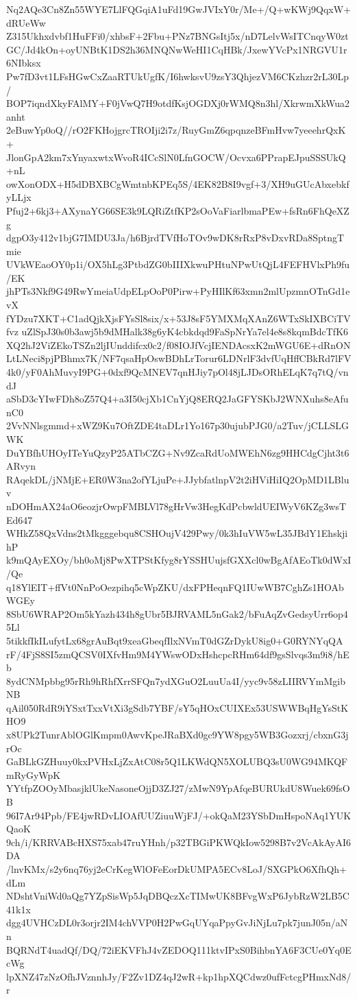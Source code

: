 Nq2AQe3Cn8Zn55WYE7LlFQGqiA1uFd19GwJVIxY0r/Me+/Q+wKWj9QqxW+dRUeWw
Z315Ukhxdvbf1HuFFi0/xhbsF+2Fbu+PNz7BNGsItj5x/nD7LelvWsITCnqyW0zt
GC/Jd4kOn+oyUNBtK1DS2h36MNQNwWeHI1CqHBk/JxewYVcPx1NRGVU1r6NIbksx
Pw7fD3vt1LFsHGwCxZaaRTUkUgfK/I6hwksvU9zsY3QhjezVM6CKzhzr2rL30Lp/
BOP7iqndXkyFAlMY+F0jVwQ7H9otdfKsjOGDXj0rWMQ8n3hl/XkrwmXkWua2anht
2eBuwYp0oQ//rO2FKHojgrcTROIji2i7z/RuyGmZ6qpqnzeBFmHvw7yeeehrQxK+
JlonGpA2km7xYnyaxwtxWvoR4ICcSlN0LfnGOCW/Ocvxa6PPrapEJpuSSSUkQ+nL
owXonODX+H5dDBXBCgWmtnbKPEq5S/4EK82B8I9vgf+3/XH9uGUcAbxebkfyLLjx
Pfuj2+6kj3+AXynaYG66SE3k9LQRiZtfKP2sOoVaFiarlbmaPEw+fsRn6FhQeXZg
dgpO3y412v1bjG7IMDU3Ja/h6BjrdTVfHoTOv9wDK8rRxP8vDxvRDa8SptngTmie
UVkWEaoOY0p1i/OX5hLg3PtbdZG0bIIIXkwuPHtuNPwUtQjL4FEFHVlxPh9fu/EK
jhPTs3Nkf9G49RwYmeiaUdpELpOoP0Pirw+PyHIlKf63xmn2mlUpzmnOTnGd1evX
fYDzu7XKT+C1adQjkXjsFYsSl8six/x+53J8sF5YMXMqXAnZ6WTxSkIXBCiTVfvz
uZlSpJ30s0b3awj5b9dMHalk38g6yK4cbkdqd9FaSpNrYa7el4e8s8kqmBdcTfK6
XQ2hJ2ViZEkoTSZn2ljIUnddifcx0c2/f08IOJfVcjIENDAcsxK2mWGU6E+dRnON
LtLNeci8pjPBhmx7K/NF7qsaHpOswBDhLrTorur6LDNrlF3dvfUqHffCBkRd7lFV
4k0/yF0AhMuvyI9PG+0dxf9QcMNEV7qnHJiy7pOl48jLJDsORhELqK7q7tQ/vndJ
aSbD3cYIwFDh8oZ57Q4+a3I50cjXb1CnYjQ8ERQ2JaGFYSKbJ2WNXuhs8eAfunC0
2VvNNlsgmmd+xWZ9Ku7OftZDE4taDLr1Yo167p30ujubPJG0/a2Tuv/jCLLSLGWK
DuYBfhUHOyITeYuQzyP25ATbCZG+Nv9ZcaRdUoMWEhN6zg9HHCdgCjht3t6ARvyn
RAqekDL/jNMjE+ER0W3na2ofYLjuPe+JJybfatlnpV2t2iHViHiIQ2OpMD1LBluv
nDOHmAX24aO6eozjrOwpFMBLVl78gHrVw3HegKdPcbwldUEIWyV6KZg3wsTEd647
WHkZ58QxVdns2tMkgggebqu8CSHOujV429Pwy/0k3hIuVW5wL35JBdY1EhskjihP
k9mQAyEXOy/bh0oMj8PwXTPStKfyg8rYSSHUujsfGXXcl0wBgAfAEoTk0dWxI/Qe
q18YlEIT+ffVt0NnPoOezpihq5cWpZKU/dxFPHeqnFQ1IUwWB7CghZs1HOAbWGEy
8SbU6WRAP2Om5kYazh434h8gUbr5BJRVAML5nGak2/bFuAqZvGedsyUrr6op45Ll
5tikkfIkILufytLx68grAuBqt9xeaGbeqfIlxNVmT0dGZrDykU8ig0+G0RYNYqQA
rF/4FjS8SI5zmQCSV0IXfvHm9M4YWswODxHshcpcRHm64df9gsSlvqs3m9i8/hEb
8ydCNMpbbg95rRh9hRhfXrrSFQn7ydXGuO2LuuUa4I/yyc9v58zLIIRVYmMgibNB
qAil050RdR9iYSxtTxxVtXi3gSdb7YBF/sY5qHOxCUIXEx53USWWBqHgYsStKHO9
x8UPk2TunrAblOGlKmpm0AwvKpeJRaBXd0gc9YW8pgy5WB3Gozxrj/cbxnG3jrOc
GaBLkGZHuuy0kxPVHxLjZxAtC08r5Q1LKWdQN5XOLUBQ3sU0WG94MKQFmRyGyWpK
YYtfpZOOyMbasjklUkeNasoneOjjD3ZJ27/zMwN9YpAfqeBURUkdU8Wuek69fsOB
96I7Ar94Ppb/FE4jwRDvLIOAfUUZiuuWjFJ/+okQaM23YSbDmHspoNAq1YUKQaoK
9ch/i/KRRVABcHXS75xab47ruYHnh/p32TBGiPKWQkIow5298B7v2VcAkAyAI6DA
/lnvKMx/s2y6nq76yj2eCrKegWlOFeEorDkUMPA5ECv8LoJ/SXGPkO6XfhQh+dLm
NDshtVniWd0aQg7YZpSisWp5JqDBQczXcTIMwUK8BFvgWxP6JybRzW2LB5C41k1x
dgg4UVHCzDL0r3orjr2IM4chVVP0H2PwGqUYqaPpyGvJiNjLu7pk7junJ05n/aNn
BQRNdT4uadQf/DQ/72iEKVFhJ4vZEDOQ111ktvIPxS0BihbnYA6F3CUe0Yq0EcWg
lpXNZ47zNzOfhJVznnhJy/F2Zv1DZ4qJ2wR+kp1hpXQCdwz0ufFctcgPHmxNd8/r
